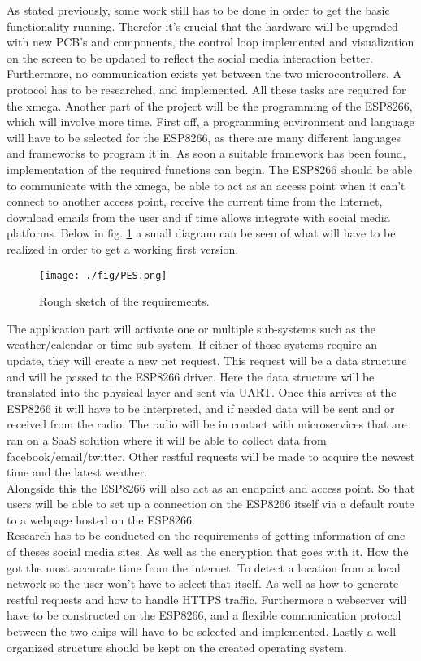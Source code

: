 As stated previously, some work still has to be done in order to get the basic functionality running. Therefor it's crucial that the hardware will be upgraded with new PCB's and components, the control loop implemented and visualization on the screen to be updated to reflect the social media interaction better. Furthermore, no communication exists yet between the two microcontrollers. A protocol has to be researched, and implemented. All these tasks are required for the xmega. Another part of the project will be the programming of the ESP8266, which will involve more time. First off, a programming environment and language will have to be selected for the ESP8266, as there are many different languages and frameworks to program it in. As soon a suitable framework has been found, implementation of the required functions can begin. The ESP8266 should be able to communicate with the xmega, be able to act as an access point when it can't connect to another access point, receive the current time from the Internet, download emails from the user and if time allows integrate with social media platforms. Below in fig. \ref{fig:block} a small diagram can be seen of what will have to be realized in order to get a working first version.
\begin{figure}[H]
	\texttt{[image: ./fig/PES.png]}
	\caption{Rough sketch of the requirements.}
	\label{fig:block}
\end{figure}
The application part will activate one or multiple sub-systems such as the weather/calendar or time sub system. If either of those systems require an update, they will create a new net request. This request will be a data structure and will be passed to the ESP8266 driver. Here the data structure will be translated into the physical layer and sent via UART. Once this arrives at the ESP8266 it will have to be interpreted, and if needed data will be sent and or received from the radio. The radio will be in contact with microservices that are ran on a SaaS solution where it will be able to collect data from facebook/email/twitter. Other restful requests will be made to acquire the newest time and the latest weather.\\ Alongside this the ESP8266 will also act as an endpoint and access point. So that users will be able to set up a connection on the ESP8266 itself via a default route to a webpage hosted on the ESP8266.\\
Research has to be conducted on the requirements of getting information of one of theses social media sites. As well as the encryption that goes with it. How the got the most accurate time from the internet. To detect a location from a local network so the user won't have to select that itself. As well as how to generate restful requests and how to handle HTTPS traffic. Furthermore a webserver will have to be constructed on the ESP8266, and a flexible communication protocol between the two chips will have to be selected and implemented. Lastly a well organized structure should be kept on the created operating system.

